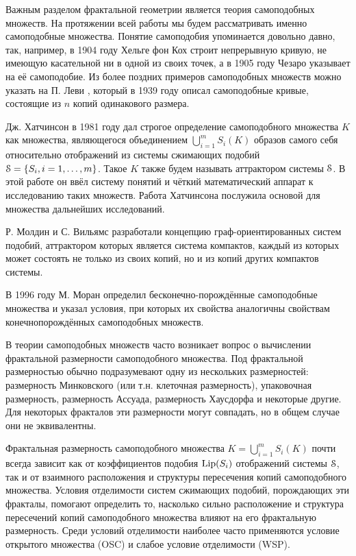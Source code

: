 Важным разделом фрактальной геометрии является теория самоподобных множеств.
На протяжении всей работы мы будем рассматривать именно самоподобные множества.
Понятие самоподобия упоминается довольно давно, так, например, в 1904 году Хельге фон Кох \cite{Koch} строит непрерывную кривую, не имеющую касательной ни в одной из своих точек, а в 1905 году Чезаро \cite{Ces} указывает на её самоподобие.
Из более поздних примеров самоподобных множеств можно указать на П. Леви \cite{Levy1939}, который в 1939 году описал самоподобные кривые, состоящие из $n$ копий одинакового размера.

Дж. Хатчинсон в 1981 году \cite{Hut1981} дал строгое определение самоподобного множества $K$ как множества, являющегося объединением $\bigcup_{i=1}^mS_i(K)$ образов самого себя относительно отображений из системы сжимающих подобий ${\EuScript S}=\{S_i, i=1,\ldots,m\}$.
Такое $K$ также будем называть аттрактором системы ${\EuScript S}$.
В этой работе он ввёл систему понятий и чёткий математический аппарат к исследованию таких множеств.
Работа Хатчинсона послужила основой для множества дальнейших исследований.

Р. Молдин и С. Вильямс \cite{MW1988} разработали концепцию граф-ори\-ен\-ти\-ро\-ванных систем подобий, аттрактором которых является система компактов, каждый из которых может состоять не только из своих копий, но и из копий других компактов системы.

В 1996 году М. Моран \cite{Moran1996}  определил бесконечно-порождённые самоподобные множества и указал условия, при которых их свойства аналогичны свойствам конечнопорождённых самоподобных множеств.

В теории самоподобных множеств часто возникает вопрос о вычислении фрактальной размерности самоподобного множества.
Под фрактальной размерностью обычно подразумевают одну из нескольких размерностей: размерность Минковского (или т.н. клеточная размерность), упаковочная размерность, размерность Ассуада, размерность Хаусдорфа и некоторые другие.
Для некоторых фракталов эти размерности могут совпадать, но в общем случае они не эквивалентны.

Фрактальная размерность самоподобного множества $K=\bigcup_{i=1}^mS_i(K)$ почти всегда зависит как от коэффициентов подобия $\mathop{\rm Lip} \nolimits(S_i)$ отображений системы ${\EuScript S}$, так и от взаимного расположения и структуры пересечения копий самоподобного множества.
Условия отделимости систем сжимающих подобий, порождающих эти фракталы, помогают определить то, насколько сильно расположение и структура пересечений копий самоподобного множества влияют на его фрактальную размерность.
Среди условий отделимости наиболее часто применяются условие открытого множества (OSC) и слабое условие отделимости (WSP).

